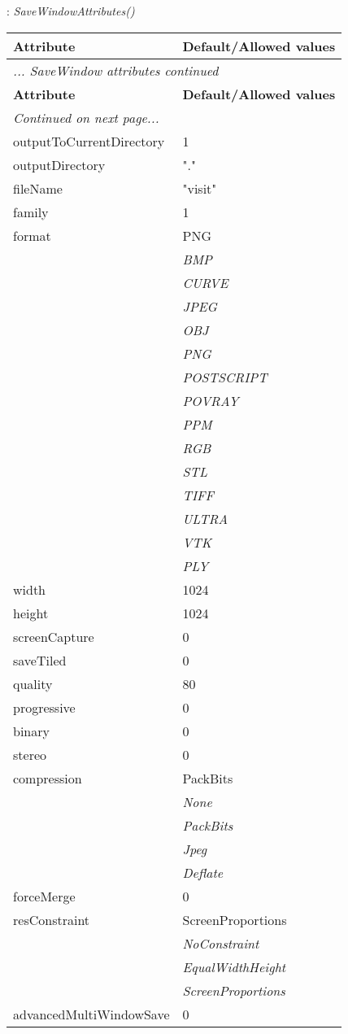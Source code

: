 \documentclass[10pt,a4paper]{report}
\begin{document}
\newpage

{}
: {\it SaveWindowAttributes() }\\[-3mm]

\begin{longtable}{ll}
{\bf Attribute} & {\bf Default/Allowed values} \\
\hline \hline
\endfirsthead
\multicolumn{2}{l}{{\it ... SaveWindow attributes continued}} \\
{\bf Attribute} & {\bf Default/Allowed values} \\
\hline \hline
\endhead
\hline
\multicolumn{2}{l}{{\it Continued on next page...}} \\
\endfoot
\hline
\endlastfoot

outputToCurrentDirectory  &  1 \\
outputDirectory  &  "." \\
fileName  &  "visit" \\
family  &  1 \\
format  &  PNG   \\
 & {\it  BMP} \\
 & {\it  CURVE} \\
 & {\it  JPEG} \\
 & {\it  OBJ} \\
 & {\it  PNG} \\
 & {\it  POSTSCRIPT} \\
 & {\it  POVRAY} \\
 & {\it  PPM} \\
 & {\it  RGB} \\
 & {\it  STL} \\
 & {\it  TIFF} \\
 & {\it  ULTRA} \\
 & {\it  VTK} \\
 & {\it  PLY} \\
width  &  1024 \\
height  &  1024 \\
screenCapture  &  0 \\
saveTiled  &  0 \\
quality  &  80 \\
progressive  &  0 \\
binary  &  0 \\
stereo  &  0 \\
compression  &  PackBits   \\
 & {\it  None} \\
 & {\it  PackBits} \\
 & {\it  Jpeg} \\
 & {\it  Deflate} \\
forceMerge  &  0 \\
resConstraint  &  ScreenProportions   \\
 & {\it  NoConstraint} \\
 & {\it  EqualWidthHeight} \\
 & {\it  ScreenProportions} \\
advancedMultiWindowSave  &  0 \\
\end{longtable}
\end{document}
